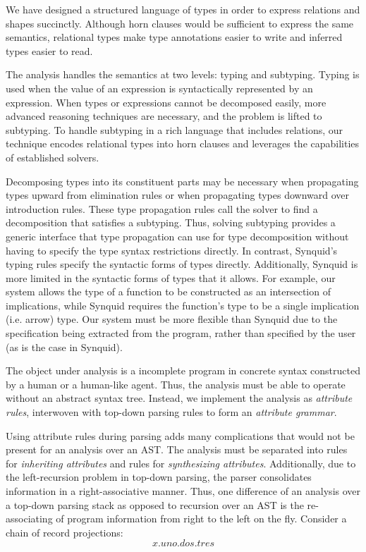 \documentclass[sigplan,screen,review]{acmart}
\begin{document}
We have designed a structured language of types in order to express relations and shapes succinctly.
Although horn clauses would be sufficient to express the same semantics, relational types make type annotations easier to write
and inferred types easier to read.

The analysis handles the semantics at two levels: typing and subtyping. Typing is used when the value of an expression
is syntactically represented by an expression. When types or expressions cannot be decomposed easily, more advanced
reasoning techniques are necessary, and the problem is lifted to subtyping. To handle subtyping in a rich language that includes  
relations, our technique encodes relational types into horn clauses and leverages the capabilities of established solvers.

Decomposing types into its constituent parts may be necessary when propagating
types upward from elimination rules or when propagating types downward over introduction rules. 
These type propagation rules call the solver to find a decomposition that satisfies a subtyping. 
Thus, solving subtyping provides a generic interface that type propagation can use for type decomposition
without having to specify the type syntax restrictions directly. 
In contrast, Synquid's typing rules specify the syntactic forms of types directly.
Additionally, Synquid is more limited in the syntactic forms of types that it allows.
For example, our system allows the type of a function to be constructed as an intersection of implications,
while Synquid requires the function's type to be a single implication (i.e. arrow) type.
Our system must be more flexible than Synquid due to the specification being extracted from the program,
rather than specified by the user (as is the case in Synquid).

The object under analysis is a incomplete program in concrete syntax constructed by a human or a human-like agent. 
Thus, the analysis must be able to operate without an abstract syntax tree. Instead, we implement the analysis 
as \textit{attribute rules}, interwoven with top-down parsing rules to form an \textit{attribute grammar}. 

Using attribute rules during parsing adds many complications that would not be present for an
analysis over an AST. 
The analysis must be separated into rules for \textit{inheriting attributes} and rules for \textit{synthesizing attributes}.
Additionally, due to the left-recursion problem in top-down parsing, 
the parser consolidates information in a right-associative manner.
Thus, one difference of an analysis over a top-down parsing stack as opposed to recursion over an AST is 
the re-associating of program information from right to the left on the fly. 
Consider a chain of record projections:  
\[ 
x.uno.dos.tres 
\]
\end{document}

